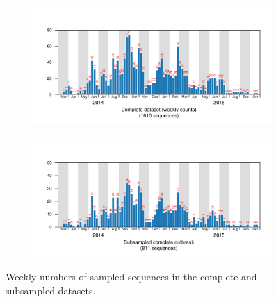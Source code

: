 	\begin{figure}[!p]
		\begin{subfigure}[b]{\textwidth}
			\centering
			\includegraphics[width=\columnwidth]{figures/complete-date-1}
		\end{subfigure}		
		\begin{subfigure}[b]{\textwidth}
			\centering
			\includegraphics[width=\columnwidth]{figures/special-subbig-date-1}
		\end{subfigure}
		\caption{Weekly numbers of sampled sequences in the complete and subsampled datasets.}
		\label{fig:seqdata_weekly}
	\end{figure}

